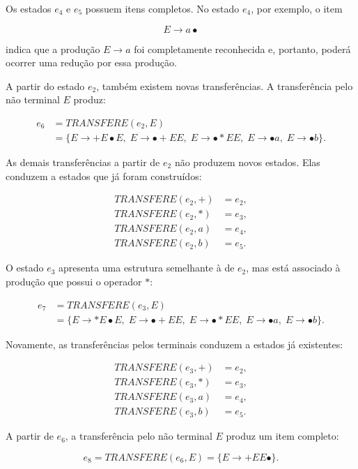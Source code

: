 \documentclass[
  brazilian,
  letterpaper,
]{book}
\theoremstyle{plain}
\theoremstyle{definition}
\theoremstyle{remark}
\begin{document}
Os estados \(e_4\) e \(e_5\) possuem itens completos. No estado \(e_4\),
por exemplo, o item

\[
E\rightarrow a\bullet
\]

indica que a produção \(E\rightarrow a\) foi completamente reconhecida
e, portanto, poderá ocorrer uma redução por essa produção.

A partir do estado \(e_2\), também existem novas transferências. A
transferência pelo não terminal \(E\) produz:

\[
\begin{aligned}
e_6
&=TRANSFERE(e_2,E)\\
&=\{
E\rightarrow+E\bullet E,\;
E\rightarrow\bullet +EE,\;
E\rightarrow\bullet *EE,\;
E\rightarrow\bullet a,\;
E\rightarrow\bullet b
\}.
\end{aligned}
\]

As demais transferências a partir de \(e_2\) não produzem novos estados.
Elas conduzem a estados que já foram construídos:

\[
\begin{aligned}
TRANSFERE(e_2,+)&=e_2,\\
TRANSFERE(e_2,*)&=e_3,\\
TRANSFERE(e_2,a)&=e_4,\\
TRANSFERE(e_2,b)&=e_5.
\end{aligned}
\]

O estado \(e_3\) apresenta uma estrutura semelhante à de \(e_2\), mas
está associado à produção que possui o operador \(*\):

\[
\begin{aligned}
e_7
&=TRANSFERE(e_3,E)\\
&=\{
E\rightarrow*E\bullet E,\;
E\rightarrow\bullet +EE,\;
E\rightarrow\bullet *EE,\;
E\rightarrow\bullet a,\;
E\rightarrow\bullet b
\}.
\end{aligned}
\]

Novamente, as transferências pelos terminais conduzem a estados já
existentes:

\[
\begin{aligned}
TRANSFERE(e_3,+)&=e_2,\\
TRANSFERE(e_3,*)&=e_3,\\
TRANSFERE(e_3,a)&=e_4,\\
TRANSFERE(e_3,b)&=e_5.
\end{aligned}
\]

A partir de \(e_6\), a transferência pelo não terminal \(E\) produz um
item completo:

\[
e_8
=TRANSFERE(e_6,E)
=\{E\rightarrow+EE\bullet\}.
\]
\end{document}
